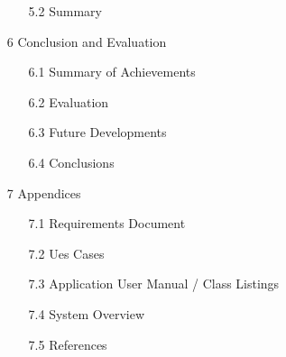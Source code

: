 \documentclass{article}
\begin{document}
\begin{itemize}
\begin{itemize}
		\item [5.2] Summary
	\end{itemize}
	\item [6] Conclusion and Evaluation
	\begin{itemize}
		\item [6.1] Summary of Achievements
		\item [6.2] Evaluation
		\item [6.3] Future Developments
		\item [6.4] Conclusions
	\end{itemize}
	\item [7] Appendices
	\begin{itemize}
		\item [7.1] Requirements Document
		\item [7.2] Ues Cases
		\item [7.3] Application User Manual / Class Listings
		\item [7.4] System Overview
		\item [7.5] References
	\end{itemize}
\end{itemize}
\newpage
\end{document}
